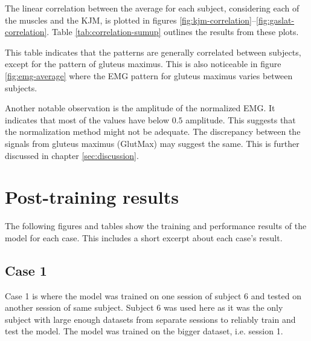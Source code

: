 \documentclass[../main.tex]{subfiles}
\begin{document}
The linear correlation between the average for each subject, considering each of the muscles and the \ac{KJM}, is plotted in figures \ref{fig:kjm-correlation}--\ref{fig:gaslat-correlation}.
Table \ref{tab:correlation-sumup} outlines the results from these plots.

This table indicates that the patterns are generally correlated between subjects, except for the pattern of gluteus maximus.
This is also noticeable in figure \ref{fig:emg-average} where the \ac{EMG} pattern for gluteus maximus varies between subjects.

Another notable observation is the amplitude of the normalized \ac{EMG}.
It indicates that most of the values have below $0.5$ amplitude.
This suggests that the normalization method might not be adequate.
The discrepancy between the signals from gluteus maximus (GlutMax) may suggest the same. 
This is further discussed in chapter \ref{sec:discussion}.

\section{Post-training results}
\label{sec:post-training-results}
The following figures and tables show the training and performance results of the model for each case.
This includes a short excerpt about each case's result.

\subsection{Case 1}
\label{sec:results-case1}
Case 1 is where the model was trained on one session of subject 6 and tested on another session of same subject.
Subject 6 was used here as it was the only subject with large enough datasets from separate sessions to reliably train and test the model.
The model was trained on the bigger dataset, i.e. session 1.
\end{document}
